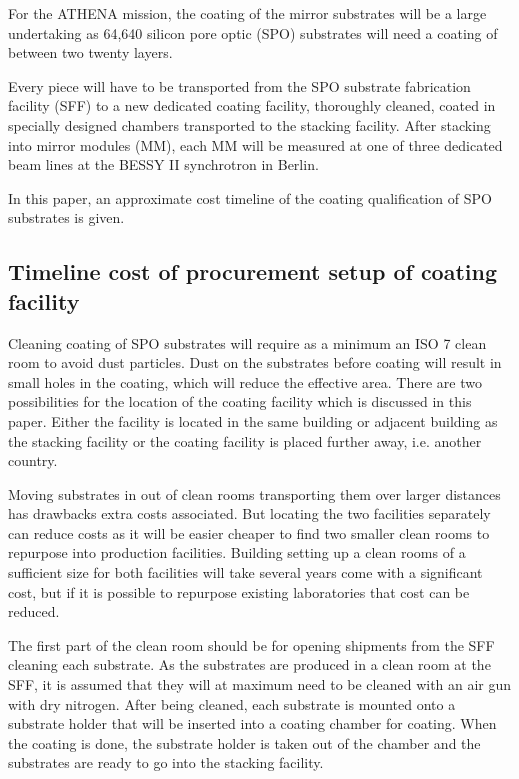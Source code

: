 For the ATHENA mission, the coating of the mirror substrates will be a large undertaking as 64,640 silicon pore optic (SPO) substrates will need a coating of between two twenty layers.

Every piece will have to be transported from the SPO substrate fabrication facility (SFF) to a new dedicated coating facility, thoroughly cleaned, coated in specially designed chambers transported to the stacking facility. After stacking into mirror modules (MM), each MM will be measured at one of three dedicated beam lines at the BESSY II synchrotron in Berlin.

In this paper, an approximate cost timeline of the coating qualification of SPO substrates is given.

\subsection{Timeline cost of procurement setup of coating facility}

Cleaning coating of SPO substrates will require as a minimum an ISO 7 clean room to avoid dust particles. Dust on the substrates before coating will result in small holes in the coating, which will reduce the effective area. There are two possibilities for the location of the coating facility which is discussed in this paper. Either the facility is located in the same building or adjacent building as the stacking facility or the coating facility is placed further away, i.e. another country.

Moving substrates in out of clean rooms transporting them over larger distances has drawbacks extra costs associated. But locating the two facilities separately can reduce costs as it will be easier cheaper to find two smaller clean rooms to repurpose into production facilities. Building setting up a clean rooms of a sufficient size for both facilities will take several years come with a significant cost, but if it is possible to repurpose existing laboratories that cost can be reduced.

The first part of the clean room should be for opening shipments from the SFF cleaning each substrate. As the substrates are produced in a clean room at the SFF, it is assumed that they will at maximum need to be cleaned with an air gun with dry nitrogen. After being cleaned, each substrate is mounted onto a substrate holder that will be inserted into a coating chamber for coating. When the coating is done, the substrate holder is taken out of the chamber and the substrates are ready to go into the stacking facility.

